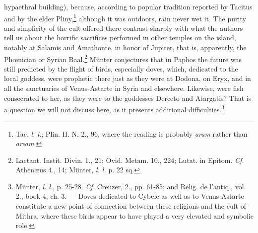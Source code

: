 \documentclass[a4paper, 11pt, oneside, polutonikogreek, english]{article}
\begin{document}
hypaethral building), because, according to popular tradition reported by Tacitus and by the elder Pliny,\footnote{Tac. \emph{l. l.}; Plin. H. N. 2., 96, where the reading is probably \emph{aram} rather than \emph{aream}.} although it was outdoors, rain never wet it. The purity and simplicity of the cult offered there contrast sharply with what the authors tell us about the horrific sacrifices performed in other temples on the island, notably at Salamis and Amathonte, in honor of Jupiter, that is, apparently, the Phœnician or Syrian Baal.\footnote{Lactant. Instit. Divin. 1., 21; Ovid. Metam. 10., 224; Lutat. in Epitom. \emph{Cf.} Athenæus 4., 14; Münter, \emph{l. l.} p. 22 sq.} Münter conjectures that in Paphos the future was still predicted by the flight of birds, especially doves, which, dedicated to the local goddess, were prophetic there just as they were at Dodona, on Eryx, and in all the sanctuaries of Venus-Astarte in Syria and elsewhere. Likewise, were fish consecrated to her, as they were to the goddesses Derceto and Atargatis? That is a question we will not discuss here, as it presents additional difficulties.\footnote{Münter, \emph{l. l.}, p. 25-28. \emph{Cf.} Creuzer, 2., pp. 61-85; and Relig. de l'antiq., vol. 2., book 4, ch. 3. --- Doves dedicated to Cybele as well as to Venus-Astarte constitute a new point of connection between these religions and the cult of Mithra, where these birds appear to have played a very elevated and symbolic role.}
\end{document}
